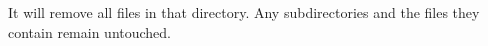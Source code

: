 It will remove all files in that directory. Any subdirectories and the files they contain remain untouched.